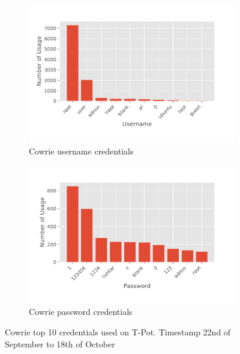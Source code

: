 \begin{figure}
    
\end{figure}

\begin{figure}
    
\end{figure}

\begin{figure}
    \centering

    \begin{subfigure}[b]{0.49\textwidth}
        \centering
        \includegraphics[width=\textwidth]{figures/tpot-cowrie-username.pdf}
        \caption{Cowrie username credentials}
        \label{fig:tpot-cowrie-username}
    \end{subfigure}
    \hfill
    \begin{subfigure}[b]{0.49\textwidth}
        \centering
        \includegraphics[width=\textwidth]{figures/tpot-cowrie-password.pdf}
        \caption{Cowrie password credentials}
        \label{fig:tpot-cowrie-password}
    \end{subfigure}
    \caption[Cowrie top 10 credentials on T-Pot]{
        Cowrie top 10 credentials used on T-Pot.
        Timestamp 22nd of September to 18th of October
    }
    \label{fig:cowrie-credentials}
\end{figure}

